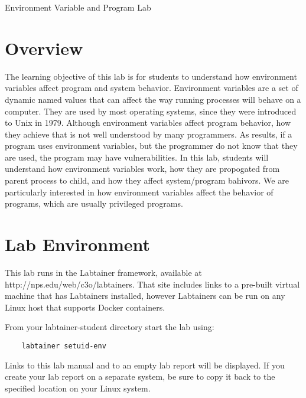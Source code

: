 








\begin{center}
{\LARGE Environment Variable and \setuid Program Lab}
\end{center}

\copyrightnotice


\section{Overview}

The learning objective of this lab is for students to understand how
environment variables affect program and system behavior. Environment
variables are a set of dynamic named values that can affect the way running processes
will behave on a computer. They are used by most operating systems, since
they were introduced to Unix in 1979. Although environment variables affect
program behavior, how they achieve that is not well understood by many
programmers. As results, if a program uses  environment
variables,  but the programmer do not know that they are used, the program
may have vulnerabilities. In this lab, students will understand how
environment variables work, how they are propogated from parent process to
child, and how they affect system/program bahivors. We are particularly
interested in how environment variables affect the behavior of \setuid
programs, which are usually privileged programs. 

\section{Lab Environment}

This lab runs in the Labtainer framework,
available at http://nps.edu/web/c3o/labtainers.
That site includes links to a pre-built virtual machine
that has Labtainers installed, however Labtainers can 
be run on any Linux host that supports Docker containers.

From your labtainer-student directory start the lab using:
\begin{verbatim}
    labtainer setuid-env
\end{verbatim}
Links to this lab manual and to an empty lab report will be displayed.  If you create your lab report on a separate system, 
be sure to copy it back to the specified location on your Linux system. 


